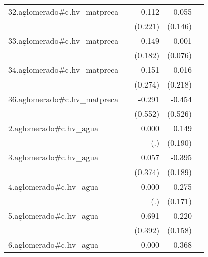 {\begin{longtable}{l*{4}{D{.}{.}{-1}}}
\addlinespace
32.aglomerado#c.hv\_matpreca&                     &       0.112         &      -0.055         &                     \\
            &                     &     (0.221)         &     (0.146)         &                     \\
\addlinespace
33.aglomerado#c.hv\_matpreca&                     &       0.149         &       0.001         &                     \\
            &                     &     (0.182)         &     (0.076)         &                     \\
\addlinespace
34.aglomerado#c.hv\_matpreca&                     &       0.151         &      -0.016         &                     \\
            &                     &     (0.274)         &     (0.218)         &                     \\
\addlinespace
36.aglomerado#c.hv\_matpreca&                     &      -0.291         &      -0.454         &                     \\
            &                     &     (0.552)         &     (0.526)         &                     \\
\addlinespace
2.aglomerado#c.hv\_agua&                     &       0.000         &       0.149         &                     \\
            &                     &         (.)         &     (0.190)         &                     \\
\addlinespace
3.aglomerado#c.hv\_agua&                     &       0.057         &      -0.395\sym{*}  &                     \\
            &                     &     (0.374)         &     (0.189)         &                     \\
\addlinespace
4.aglomerado#c.hv\_agua&                     &       0.000         &       0.275         &                     \\
            &                     &         (.)         &     (0.171)         &                     \\
\addlinespace
5.aglomerado#c.hv\_agua&                     &       0.691         &       0.220         &                     \\
            &                     &     (0.392)         &     (0.158)         &                     \\
\addlinespace
6.aglomerado#c.hv\_agua&                     &       0.000         &       0.368         &                     \\

\end{longtable}}
